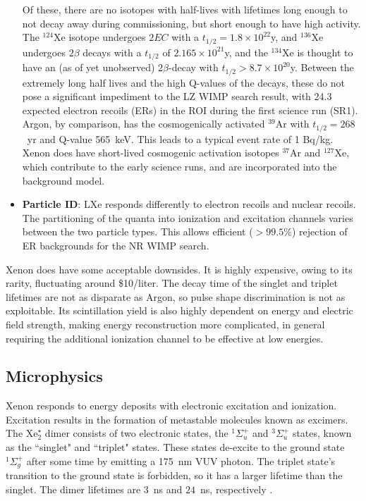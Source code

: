 \begin{itemize}
    Of these, there are no isotopes with half-lives with lifetimes long enough to not decay away during commissioning, but short enough to have high activity.
    The $^{124}$Xe isotope undergoes $2EC$\cite{aprile_observation_2019} with a $t_{1/2}=1.8\times 10^{22}$y, and $^{136}$Xe undergoes $2\beta$ decays with a $t_{1/2}$ of $2.165\times 10^{21}$y\cite{albert_improved_2014}, and the  $^{134}$Xe is thought to have an (as of yet unobserved) $2\beta$-decay with $t_{1/2} > 8.7\times 10^{20}$y\cite{collaboration_searches_2017}.
    Between the extremely long half lives and the high Q-values of the decays, these do not pose a significant impediment to the LZ WIMP search result, with 24.3 expected electron recoils (ERs) in the ROI during the first science run (SR1)\cite{aalbers_first_2022}.
    Argon, by comparison, has the cosmogenically activated $^{39}$Ar with $t_{1/2}=268$~yr and Q-value 565~keV.
    This leads to a typical event rate of 1 Bq/kg.
    Xenon does have short-lived cosmogenic activation isotopes $^{37}$Ar and $^{127}$Xe, which contribute to the early science runs\cite{aalbers_cosmogenic_2022}, and are incorporated into the background model.
    \item \textbf{Particle ID}:
    LXe responds differently to electron recoils and nuclear recoils. 
    The partitioning of the quanta into ionization and excitation channels varies between the two particle types.
    This allows efficient ($>99.5\%$) rejection of ER backgrounds for the NR WIMP search.
\end{itemize}

Xenon does have some acceptable downsides.
It is highly expensive, owing to its rarity, fluctuating around \$10/liter.
The decay time of the singlet and triplet lifetimes are not as disparate as Argon, so pulse shape discrimination is not as exploitable.
Its scintillation yield is also highly dependent on energy and electric field strength, making energy reconstruction more complicated, in general requiring the additional ionization channel to be effective at low energies. 

\subsection{Microphysics}
Xenon responds to energy deposits with electronic excitation and ionization.
Excitation results in the formation of metastable molecules known as excimers.
The $\text{Xe}_2^\star$ dimer consists of two electronic states, the $^1\Sigma_u^+$ and $^3\Sigma^+_u$ states, known as the ``singlet" and ``triplet" states.
These states de-excite to the ground state $^1\Sigma^+_g$ after some time by emitting a 175~nm VUV photon\cite{fujii_high-accuracy_2015}.
The triplet state's transition to the ground state is forbidden, so it has a larger lifetime than the singlet.
The dimer lifetimes are $3$~ns and $24$~ns, respectively \cite{mock_modeling_2014}.

